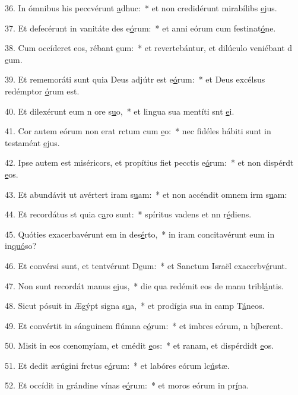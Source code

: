 36. In ómnibus his peccvérunt \uline{a}dhuc:~* et non credidérunt mirabílibs \uline{e}jus.\par 
37. Et defecérunt in vanitáte des e\uline{ó}rum:~* et anni eórum cum festinat\uline{ó}ne.\par 
38. Cum occíderet eos, rébant \uline{e}um:~* et revertebántur, et dilúculo veniébant d \uline{e}um.\par 
39. Et rememoráti sunt quia Deus adjútr est e\uline{ó}rum:~* et Deus excélsus redémptor \uline{ó}rum est.\par 
40. Et dilexérunt eum n ore s\uline{u}o,~* et lingua sua mentíti snt \uline{e}i.\par 
41. Cor autem eórum non erat rctum cum \uline{e}o:~* nec fidéles hábiti sunt in testamént \uline{e}jus.\par 
42. Ipse autem est miséricors, et propítius fiet pecctis e\uline{ó}rum:~* et non dispérdt \uline{e}os.\par 
43. Et abundávit ut avértert iram s\uline{u}am:~* et non accéndit omnem irm s\uline{u}am:\par 
44. Et recordátus st quia c\uline{a}ro sunt:~* spíritus vadens et nn r\uline{é}diens.\par 
45. Quóties exacerbavérunt em in des\uline{é}rto,~* in iram concitavérunt eum in in\uline{quó}so?\par 
46. Et convérsi sunt, et tentvérunt D\uline{e}um:~* et Sanctum Israël exacerbv\uline{é}runt.\par 
47. Non sunt recordát manus \uline{e}jus,~* die qua redémit eos de manu tribl\uline{á}ntis.\par 
48. Sicut pósuit in Ægýpt signa s\uline{u}a,~* et prodígia sua in camp T\uline{á}neos.\par 
49. Et convértit in sánguinem flúmna e\uline{ó}rum:~* et imbres eórum, n b\uline{í}berent.\par 
50. Misit in eos cœnomyíam, et cmédit \uline{e}os:~* et ranam, et dispérdidt \uline{e}os.\par 
51. Et dedit ærúgini frctus e\uline{ó}rum:~* et labóres eórum lc\uline{ú}stæ.\par 
52. Et occídit in grándine vínas e\uline{ó}rum:~* et moros eórum in pr\uline{í}na.\par 
